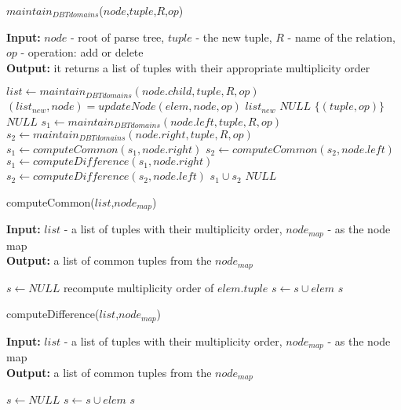 \documentclass[12pt]{article}
\begin{document}
\begin{algorithm}[H]
\caption{$maintain_{DBTdomains}$($node$,$tuple$,$R$,$op$)} 
\label{alg2}
\textbf{Input:} $node$ - root of parse tree, $tuple$ - the new tuple, $R$ - name of the relation, $op$ - operation: add or delete \\
\textbf{Output:} it returns a list of tuples with their appropriate multiplicity order\\
\begin{algorithmic}[1]
\STATE $list\gets maintain_{DBTdomains}(node.child,tuple,R,op)$
\STATE $(list_{new},node)=updateNode(elem,node,op)$
\ENDFOR
\RETURN  $list_{new}$
\ENDIF
\RETURN  $NULL$
\RETURN  $\{(tuple,op)\}$
\ENDIF
\RETURN $NULL$
\STATE $s_{1}\gets maintain_{DBTdomains}(node.left,tuple,R,op)$
\STATE $s_{2}\gets maintain_{DBTdomains}(node.right,tuple,R,op)$
\STATE $s_{1}\gets computeCommon(s_{1},node.right)$
\STATE $s_{2}\gets computeCommon(s_{2},node.left)$
\ENDIF
{}
\STATE $s_{1}\gets computeDifference(s_{1},node.right)$
\STATE $s_{2}\gets computeDifference(s_{2},node.left)$
\ENDIF
\RETURN  $s_{1}\cup s_{2}$
\ENDIF
\RETURN $NULL$
\end{algorithmic}
\end{algorithm}

\begin{algorithm}[H]
\caption{computeCommon($list$,$node_{map}$)}
\label{alg4}
\textbf{Input:} $list$ - a list of tuples with their multiplicity order, $node_{map}$ - as the node map\\
\textbf{Output:} a list of common tuples from the $node_{map}$\\
\begin{algorithmic}[1]
\STATE $s\gets NULL$
\STATE recompute multiplicity order of $elem.tuple$
\STATE $s\gets s \cup elem$
\ENDIF
\ENDFOR
\ENDIF
\RETURN  $s$
\end{algorithmic}
\end{algorithm}

\begin{algorithm}[H]
\caption{computeDifference($list$,$node_{map}$)}
\label{alg5}
\textbf{Input:} $list$ - a list of tuples with their multiplicity order, $node_{map}$ - as the node map\\
\textbf{Output:} a list of common tuples from the $node_{map}$\\
\begin{algorithmic}[1]
\STATE $s\gets NULL$
\STATE $s\gets s \cup elem$
\ENDIF
\ENDFOR
\ENDIF
\RETURN $s$
\end{algorithmic}
\end{algorithm}
\end{document}
